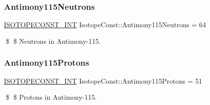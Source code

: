 \subsubsection{\texorpdfstring{Antimony115\+Neutrons}{Antimony115Neutrons}}
{\footnotesize\ttfamily \mbox{\hyperlink{group___isotope_const-_macros_ga5f18360b3e99483a35c32d789e62621c}{I\+S\+O\+T\+O\+P\+E\+C\+O\+N\+S\+T\+\_\+\+I\+NT}} Isotope\+Const\+::\+Antimony115\+Neutrons = 64}

\$ \$ Neutrons in Antimony-\/115. \mbox{\label{group___isotope_const-_antimony-_sb115_gab7a995eeae3952040d33024cf5dc11af}} 
\subsubsection{\texorpdfstring{Antimony115\+Protons}{Antimony115Protons}}
{\footnotesize\ttfamily \mbox{\hyperlink{group___isotope_const-_macros_ga5f18360b3e99483a35c32d789e62621c}{I\+S\+O\+T\+O\+P\+E\+C\+O\+N\+S\+T\+\_\+\+I\+NT}} Isotope\+Const\+::\+Antimony115\+Protons = 51}

\$ \$ Protons in Antimony-\/115. 
